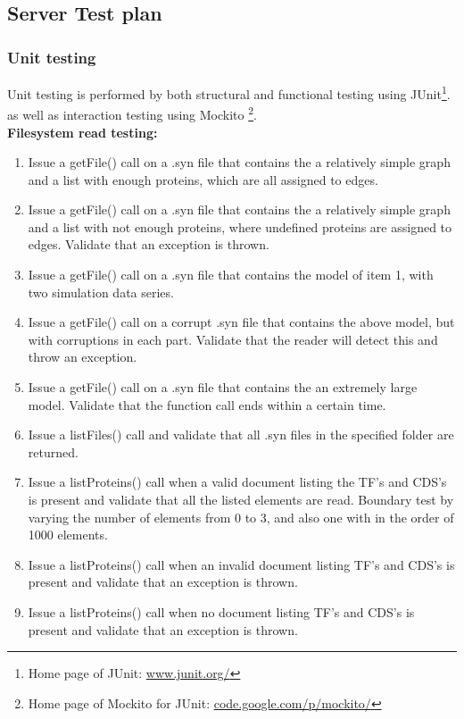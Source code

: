 \subsection{Server Test plan}

\subsubsection{Unit testing}
Unit testing is performed by both structural and functional testing using JUnit\footnote{Home page of JUnit: \url{www.junit.org/}}.\, as well as interaction testing using Mockito \footnote{Home page of Mockito for JUnit: \url{code.google.com/p/mockito/}}.\\
\textbf{Filesystem read testing:
}\begin{enumerate}
\item Issue a getFile() call on a .syn file that contains the a relatively simple graph  and a list with enough proteins, which are all assigned to edges.

\item Issue a getFile() call on a .syn file that contains the a relatively simple graph  and a list with not enough proteins, where undefined proteins are assigned to edges. Validate that an exception is thrown.\item Issue a getFile() call on  a .syn file that contains the  model of item 1, with two simulation data series.
\item Issue a getFile() call on  a corrupt .syn file that contains the above model, but with corruptions in each part.
Validate that the reader will detect this and throw an exception.
\item Issue a getFile() call on  a .syn file that contains the an extremely large model. Validate that the function call ends within a certain time. 
\item Issue a listFiles() call and validate that all .syn files in the specified folder are returned.

\item Issue a listProteins() call when a valid document listing the TF's and CDS's is present and validate that all the listed elements are read.
 Boundary test by varying the number of elements from 0 to 3, and also one with in the order of 1000 elements.\item Issue a listProteins() call when an  invalid document listing TF's and CDS's is present and validate that an exception is thrown.
\item Issue a listProteins() call when no document listing TF's and CDS's is present and validate that an exception is thrown.\end{enumerate}

